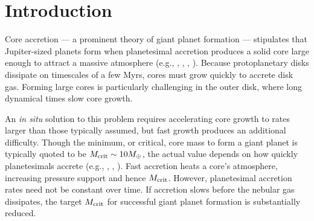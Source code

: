 \documentclass[apj]{emulateapj}
\begin{document}
\section{Introduction}
\label{intro}


Core accretion --- a prominent theory of giant planet formation --- stipulates that Jupiter-sized planets form when planetesimal accretion produces a solid core large enough to attract a massive atmosphere   (e.g., \citealt{mizuno78}, \citealt{stevenson82}, \citealt{boden86}, \citealt{dangelo11}). Because protoplanetary disks dissipate on timescales of a few Myrs, cores must grow quickly to accrete disk gas. Forming large cores is particularly challenging in the outer disk, where long dynamical times slow core growth. %

An \textit{in situ} solution to this problem requires accelerating core growth to rates larger than those typically assumed, but fast growth produces an additional difficulty.  Though the minimum, or critical, core mass to form a giant planet is typically quoted to be $M_{\rm crit}\sim 10M_{\oplus}$, the actual value depends on how quickly planetesimals accrete (e.g., \citealt{ikoma00}, \citealt{pollack96}, \citealt{rafikov06}).  Fast accretion heats a core's  atmosphere, increasing pressure support and hence $M_{\rm crit}$.   However, planetesimal accretion rates need not be constant over time.  If  accretion slows before the nebular gas dissipates, the target $M_{\rm crit}$ for successful giant planet formation is substantially reduced.
\end{document}
